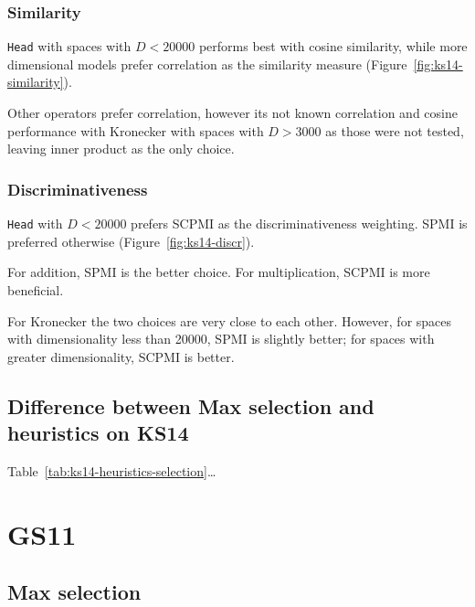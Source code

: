 \subsubsection{Similarity}
\texttt{Head} with spaces with $D < 20000$ performs best with cosine similarity, while more dimensional models prefer correlation as the similarity measure (Figure~\ref{fig:ks14-similarity}).

Other operators prefer correlation, however its not known correlation and cosine performance with Kronecker with spaces with $D > 3000$ as those were not tested, leaving inner product as the only choice.

\subsubsection{Discriminativeness}


\texttt{Head} with $D < 20000$ prefers SCPMI as the discriminativeness weighting. SPMI is preferred otherwise (Figure~\ref{fig:ks14-discr}).

For addition, SPMI is the better choice. For multiplication, SCPMI is more beneficial.

For Kronecker the two choices are very close to each other. However, for spaces with dimensionality less than 20000, SPMI is slightly better; for spaces with greater dimensionality, SCPMI is better.

\subsection{Difference between Max selection and heuristics on KS14}


Table~\ref{tab:ks14-heuristics-selection}\ldots

% 

\section{GS11}
\label{sec:gs11}


\subsection{Max selection}
\label{sec:max-selection-gs11}

